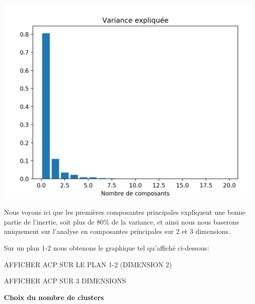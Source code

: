 \documentclass[ ]{article}
\begin{document}
\begin{center}
\includegraphics[scale=0.50]{variance_explique.png}
\end{center}

\noindent
Nous voyons ici que les premières composantes principales expliquent une bonne partie de l'inertie, soit plus de 80\% de la variance, et ainsi nous nous baserons uniquement sur l'analyse en composantes principales sur 2 et 3 dimensions. 

\noindent
Sur un plan 1-2 nous obtenons le graphique tel qu'affiché ci-dessous:

AFFICHER ACP SUR LE PLAN 1-2 (DIMENSION 2)

AFFICHER ACP SUR 3 DIMENSIONS



\vspace{5 mm}
\noindent
\begin{large}
\textbf{Choix du nombre de clusters}
\end{large}
\end{document}
